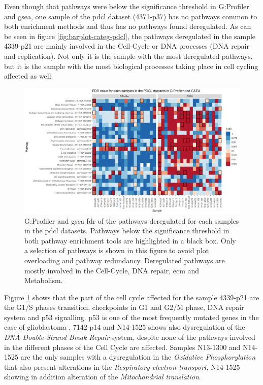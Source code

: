Even though that pathways were below the significance threshold in G:Profiler and \acrshort{gsea}, one sample of the \acrshort{pdcl} dataset (4371-p37) has no pathways common to both enrichment methods and thus has no pathways found deregulated.
As can be seen in figure \ref*{fig:barplot-categ-pdcl}, the pathways deregulated in the sample 4339-p21 are mainly involved in the Cell-Cycle or DNA processes (DNA repair and replication).
Not only it is the sample with the most deregulated pathways, but it is the sample with the most biological processes taking place in cell cycling affected as well.

\begin{figure}
    \includegraphics[width=\textwidth]{img/heatmap-fdr-pathway}
    \caption{
        G:Profiler and \acrshort{gsea} \acrfull{fdr} of the pathways deregulated for each samples in the \acrshort{pdcl} datasets.
        Pathways below the significance threshold in both pathway enrichment tools are highlighted in a black box.
        Only a selection of pathways is shown in this figure to avoid plot overloading and pathway redundancy.
        Deregulated pathways are mostly involved in the Cell-Cycle, DNA repair, \acrlong{ecm} and Metabolism.
    }
    \label{fig:heatmap-fdr-pathway}
\end{figure}

Figure \ref*{fig:heatmap-fdr-pathway} shows that the part of the cell cycle affected for the sample 4339-p21 are the G1/S phases transition, checkpoints in G1 and G2/M phase, DNA repair system and p53 signalling.
p53 is one of the most frequently mutated genes in the case of glioblastoma \cite*{McLendon2008}.
7142-p14 and N14-1525 shows also dysregulation of the \textit{DNA Double-Strand Break Repair} system, despite none of the pathways involved in the different phases of the Cell Cycle are affected.
Samples N13-1300 and N14-1525 are the only samples with a dysregulation in the \textit{Oxidative Phosphorylation} that also present alterations in the \textit{Respiratory electron transport}, N14-1525 showing in addition alteration of the \textit{Mitochondrial translation}.
